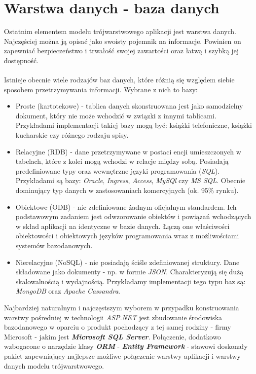 \section{Warstwa danych - baza danych}
    Ostatnim elementem modelu trójwarstwowego aplikacji jest warstwa danych.
    Najczęściej można ją opisać jako swoisty pojemnik na informacje. Powinien on zapewniać bezpieczeństwo i trwałość swojej zawartości oraz łatwą i szybką jej dostępność. \\
    \\
    Istnieje obecnie wiele rodzajów baz danych, które różnią się względem siebie sposobem przetrzymywania informacji. Wybrane z nich to bazy:
    \begin{itemize}
        \item Proste (kartotekowe) - tablica danych skonstruowana jest jako samodzielny dokument, który nie może wchodzić w związki z innymi tablicami. Przykładami implementacji takiej bazy mogą być: książki telefoniczne, książki kucharskie czy różnego rodzaju spisy.
        \item Relacyjne (RDB) - dane przetrzymywane w postaci encji umieszczonych w tabelach, które z kolei mogą wchodzi w relacje między sobą. Posiadają predefiniowane typy oraz wewnętrzne języki programowania (\textit{SQL}). Przykładami są bazy: \textit{Oracle}, \textit{Ingress}, \textit{Access}, \textit{MySQl} czy \textit{MS SQL}. Obecnie dominujący typ danych w zastosowaniach komercyjnych (ok. 95\% rynku).
        \item Obiektowe (ODB) - nie zdefiniowane żadnym oficjalnym standardem. Ich podstawowym zadaniem jest odwzorowanie obiektów i powiązań wchodzących w skład aplikacji na identyczne w bazie danych. Łączą one właściwości obiektowości i obiektowych języków programowania wraz z możliwościami systemów bazodanowych.
        \item Nierelacyjne (NoSQL) - nie posiadają ściśle zdefiniowanej struktury. Dane składowane jako dokumenty - np. w formie \textit{JSON}. Charakteryzują się dużą skalowalnością i wydajnością. Przykładamy implementacji tego typu baz są: \textit{MongoDB} oraz \textit{Apache Cassandra}.
    \end{itemize}
    Najbardziej naturalnym i najczęstszym wyborem w przypadku konstruowania warstwy pośredniej w technologii \textit{ASP.NET} jest zbudowanie środowiska bazodanowego w oparciu o produkt pochodzący z tej samej rodziny - firmy Microsoft - jakim jest \textbf{\textit{Microsoft SQL Server}}. Połączenie, dodatkowo wzbogacone o narzędzie klasy \textbf{\textit{ORM}} - \textit{\textbf{Entity Framework}} - stawowi doskonały pakiet zapewniający najlepsze możliwe połączenie warstwy aplikacji i warstwy danych modelu trójwarstwowego.
    
